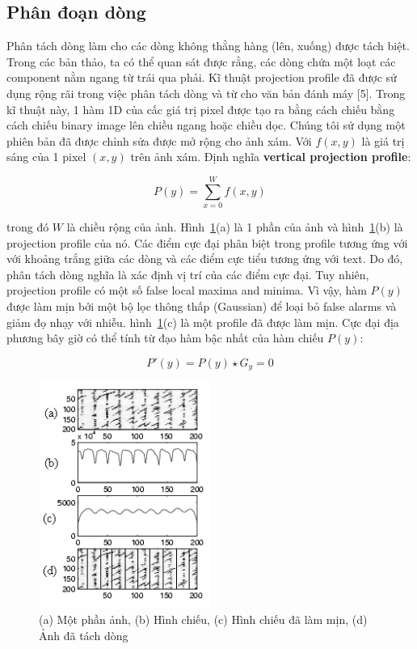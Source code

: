 \documentclass[a4paper]{article}
\begin{document}
\subsection{Phân đoạn dòng}
Phân tách dòng làm cho các dòng không thằng hàng (lên, xuống) được tách biệt. Trong các bản thảo, ta có thể quan sát được rằng, các dòng chứa một loạt các component nằm ngang từ trái qua phải. Kĩ thuật projection profile đã được sử dụng rộng rãi trong việc phân tách dòng và từ cho văn bản đánh máy [5]. Trong kĩ thuật này, 1 hàm 1D của cấc giá trị pixel được tạo ra bằng cách chiếu bằng cách chiếu binary image lên chiều ngang hoặc chiều dọc. Chúng tôi sử dụng một phiên bản đã được chỉnh sửa được mở rộng cho ảnh xám. Với $f(x, y)$  là giá trị sáng của 1 pixel $(x, y)$ trên ảnh xám. Định nghĩa \textbf{vertical projection profile}:

\begin{equation}
    P(y) = \sum ^W_{x = 0}f(x, y)
\end{equation}

trong đó $W$ là chiều rộng của ảnh. Hình~\ref{fig:fig1}(a) là 1 phần của ảnh và hình~\ref{fig:fig1}(b) là projection profile của nó. Các điểm cực đại phân biệt trong profile tương ứng với với khoảng trắng giữa các dòng và các điểm cực tiểu tương ứng với text. Do đó, phân tách dòng nghĩa là xác định vị trí của các điểm cực đại. Tuy nhiên, projection profile có một số false local maxima and minima. Vì vậy, hàm $P(y)$ được làm mịn bởi một bộ lọc thông thấp (Gaussian) để loại bỏ false alarms và giảm đọ nhạy với nhiễu. hình~\ref{fig:fig1}(c) là một profile đã được làm mịn. Cực đại địa phương bây giờ có thể tính từ đạo hàm bậc nhất của hàm chiếu $P(y)$:

\begin{equation}
    P'(y) = P(y) \star G_y = 0
\end{equation}

\begin{figure}
    \centering
    \includegraphics[width=0.5\textwidth]{fig1.png}
    \caption{(a) Một phần ảnh, (b) Hình chiếu, (c) Hình chiếu đã làm mịn, (d) Ảnh đã tách dòng}
    \label{fig:fig1}
\end{figure}
\end{document}
